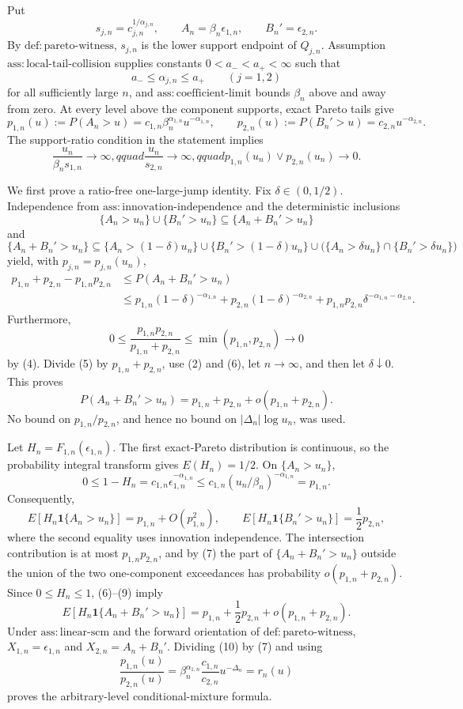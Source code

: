 Put
\[
s_{j,n}=c_{j,n}^{1/\alpha_{j,n}},\qquad
A_n=\beta_n\epsilon_{1,n},\qquad B_n'=\epsilon_{2,n}.
\tag{1}
\]
By \(\mathrm{def{:}pareto\text{-}witness}\), \(s_{j,n}\) is the lower support endpoint of \(Q_{j,n}\). Assumption \(\mathrm{ass{:}local\text{-}tail\text{-}collision}\) supplies constants \(0<a_-<a_+<\infty\) such that
\[
a_-\leq\alpha_{j,n}\leq a_+\qquad(j=1,2)
\tag{2}
\]
for all sufficiently large \(n\), and \(\mathrm{ass{:}coefficient\text{-}limit}\) bounds \(\beta_n\) above and away from zero. At every level above the component supports, exact Pareto tails give
\[
p_{1,n}(u):=P(A_n>u)
=c_{1,n}\beta_n^{\alpha_{1,n}}u^{-\alpha_{1,n}},
\qquad
p_{2,n}(u):=P(B_n'>u)=c_{2,n}u^{-\alpha_{2,n}}.
\tag{3}
\]
The support-ratio condition in the statement implies
\[
\frac{u_n}{\beta_ns_{1,n}}\to\infty,qquad
\frac{u_n}{s_{2,n}}\to\infty,qquad
p_{1,n}(u_n)\vee p_{2,n}(u_n)\to0.
\tag{4}
\]

We first prove a ratio-free one-large-jump identity. Fix \(\delta\in(0,1/2)\). Independence from \(\mathrm{ass{:}innovation\text{-}independence}\) and the deterministic inclusions
\[
\{A_n>u_n\}\cup\{B_n'>u_n\}
\subseteq\{A_n+B_n'>u_n\}
\]
and
\[
\{A_n+B_n'>u_n\}
\subseteq
\{A_n>(1-\delta)u_n\}\cup\{B_n'>(1-\delta)u_n\}
\cup\bigl(\{A_n>\delta u_n\}\cap\{B_n'>\delta u_n\}\bigr)
\]
yield, with \(p_{j,n}=p_{j,n}(u_n)\),
\[
\begin{split}
p_{1,n}+p_{2,n}-p_{1,n}p_{2,n}
&\leq P(A_n+B_n'>u_n)\\
&\leq p_{1,n}(1-\delta)^{-\alpha_{1,n}}
+p_{2,n}(1-\delta)^{-\alpha_{2,n}}
+p_{1,n}p_{2,n}\delta^{-\alpha_{1,n}-\alpha_{2,n}}.
\end{split}
\tag{5}
\]
Furthermore,
\[
0\leq\frac{p_{1,n}p_{2,n}}{p_{1,n}+p_{2,n}}
\leq\min(p_{1,n},p_{2,n})\to0
\tag{6}
\]
by (4). Divide (5) by \(p_{1,n}+p_{2,n}\), use (2) and (6), let \(n\to\infty\), and then let \(\delta\downarrow0\). This proves
\[
P(A_n+B_n'>u_n)
=p_{1,n}+p_{2,n}+o(p_{1,n}+p_{2,n}).
\tag{7}
\]
No bound on \(p_{1,n}/p_{2,n}\), and hence no bound on \(|\Delta_n|\log u_n\), was used.

Let \(H_n=F_{1,n}(\epsilon_{1,n})\). The first exact-Pareto distribution is continuous, so the probability integral transform gives \(E(H_n)=1/2\). On \(\{A_n>u_n\}\),
\[
0\leq1-H_n=c_{1,n}\epsilon_{1,n}^{-\alpha_{1,n}}
\leq c_{1,n}(u_n/\beta_n)^{-\alpha_{1,n}}=p_{1,n}.
\tag{8}
\]
Consequently,
\[
E[H_n\mathbf1\{A_n>u_n\}]=p_{1,n}+O(p_{1,n}^2),
\qquad
E[H_n\mathbf1\{B_n'>u_n\}]=\frac12p_{2,n},
\tag{9}
\]
where the second equality uses innovation independence. The intersection contribution is at most \(p_{1,n}p_{2,n}\), and by (7) the part of \(\{A_n+B_n'>u_n\}\) outside the union of the two one-component exceedances has probability \(o(p_{1,n}+p_{2,n})\). Since \(0\leq H_n\leq1\), (6)--(9) imply
\[
E[H_n\mathbf1\{A_n+B_n'>u_n\}]
=p_{1,n}+\frac12p_{2,n}+o(p_{1,n}+p_{2,n}).
\tag{10}
\]
Under \(\mathrm{ass{:}linear\text{-}scm}\) and the forward orientation of \(\mathrm{def{:}pareto\text{-}witness}\), \(X_{1,n}=\epsilon_{1,n}\) and \(X_{2,n}=A_n+B_n'\). Dividing (10) by (7) and using
\[
\frac{p_{1,n}(u)}{p_{2,n}(u)}
=\beta_n^{\alpha_{1,n}}\frac{c_{1,n}}{c_{2,n}}u^{-\Delta_n}=r_n(u)
\tag{11}
\]
proves the arbitrary-level conditional-mixture formula.

